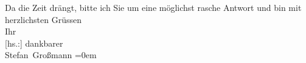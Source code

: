 \begin{ledgroupsized}[t]{13cm}
           {\pb}Da die Zeit drängt, bitte ich Sie um eine
               möglichst rasche Antwort und bin\pend
           \pstart
           mit herzlichsten Grüssen{\\[\baselineskip]}Ihr{\\[\baselineskip]}{[}hs.:{]} dankbarer{\\[\baselineskip]}\spacefill\mbox{Stefan Großmann}\pend
           \leftskip=0em{}          \endnumbering{}\end{ledgroupsized}  \newcommand{\dateiname}{L02378}\newcommand{\titel}{Stefan Großmann an Arthur Schnitzler, 26. 4. 1922}\newcommand{\editorInnen}{ Martin Anton Müller und Gerd-Hermann Susen}
            \footnotesize
\begin{ledgroupsized}[t]{11.5cm}
\end{ledgroupsized}
         
      